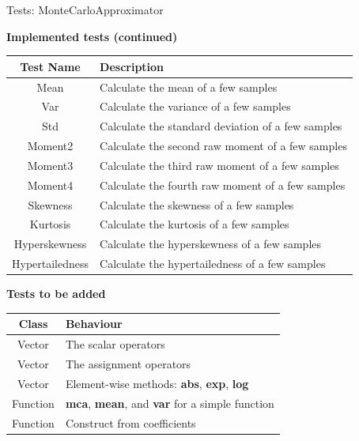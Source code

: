 \documentclass[8pt]{beamer}
\begin{document}
\begin{frame}{Tests: MonteCarloApproximator}
    \begin{table}
        \centering
        \textbf{Implemented tests (continued)} \\
        \vfill
        \begin{tabular}{|c|l|}
            \hline
            \textbf{Test Name} & \textbf{Description} \\
            \hline
            Mean & Calculate the mean of a few samples \\
            Var & Calculate the variance of a few samples \\
            Std & Calculate the standard deviation of a few samples \\
            Moment2 & Calculate the second raw moment of a few samples \\
            Moment3 & Calculate the third raw moment of a few samples \\
            Moment4 & Calculate the fourth raw moment of a few samples \\
            Skewness & Calculate the skewness of a few samples \\
            Kurtosis & Calculate the kurtosis of a few samples \\
            Hyperskewness & Calculate the hyperskewness of a few samples \\
            Hypertailedness & Calculate the hypertailedness of a few samples \\
            \hline
        \end{tabular}
    \end{table}

    \begin{table}
        \centering
        \textbf{Tests to be added} \\
        \vfill
        \begin{tabular}{|c|l|}
            \hline
            \textbf{Class} & \textbf{Behaviour} \\
            \hline
            Vector & The scalar operators \\
            Vector & The assignment operators \\
            Vector & Element-wise methods: \textbf{abs}, \textbf{exp}, \textbf{log} \\
            Function & \textbf{mca}, \textbf{mean}, and \textbf{var} for a simple function \\
            Function & Construct from coefficients \\
            \hline
        \end{tabular}
    \end{table}
\end{frame}
\end{document}
